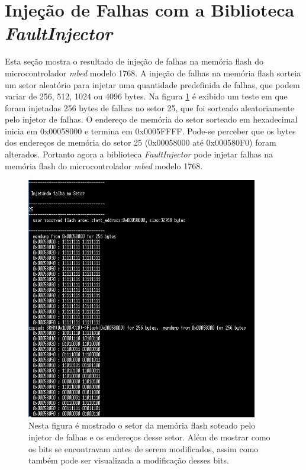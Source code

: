 \section{Injeção de Falhas com a Biblioteca \textit{FaultInjector}}

Esta seção mostra o resultado de injeção de falhas na memória flash do microcontrolador \textit{mbed} modelo 1768. A injeção de falhas na memória flash sorteia um setor aleatório para injetar uma quantidade predefinida de falhas, que podem variar de 256, 512, 1024 ou 4096 bytes. Na figura \ref{Img:injecaoFlash} é exibido um teste em que foram injetadas 256 bytes de falhas no setor 25, que foi sorteado aleatoriamente pelo injetor de falhas. O endereço de memória do setor sorteado em hexadecimal inicia em 0x00058000 e termina em 0x0005FFFF. Pode-se perceber que os bytes dos endereços de memória do setor 25 (0x00058000 até 0x000580F0) foram alterados. Portanto agora a biblioteca \textit{FaultInjector} pode injetar falhas na memória flash do microcontrolador \textit{mbed} modelo 1768.

\begin{figure}
	\centering
	\includegraphics[width=0.9\textwidth]{figuras/injecaoFlash.jpg}
	\caption[Injeção de Falhas na Memória Flash]{Nesta figura é mostrado o setor da memória flash soteado pelo injetor de falhas e os endereços desse setor. Além de mostrar como os bits se encontravam antes de serem modificados, assim como também pode ser visualizada a modificação desses bits. }
	\label{Img:injecaoFlash}	
\end{figure}